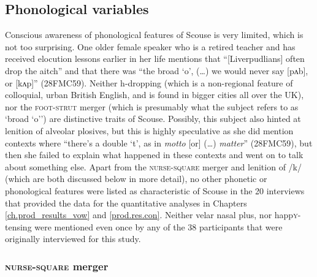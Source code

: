 \subsection{Phonological variables}
\label{aware_res.phon}

Conscious awareness of phonological features of Scouse is very limited, which is not too surprising.
One older female speaker who is a retired teacher and has received elocution lessons earlier in her life mentions that ``[Liverpudlians] often drop the aitch'' and that there was ``the broad `o', (\ldots) we would never say [pʌb], or [kʌp]'' (28FMC59).
Neither h-dropping (which is a non-regional feature of colloquial, urban British English, and is found in bigger cities all over the UK), nor the \textsc{foot}-\textsc{strut} merger (which is presumably what the subject refers to as `broad `o'') are distinctive traits of Scouse.
Possibly, this subject also hinted at lenition of alveolar plosives, but this is highly speculative as she did mention contexts where ``there's a double `t', as in \emph{motto} [or] (\ldots) \emph{matter}'' (28FMC59), but then she failed to explain what happened in these contexts and went on to talk about something else.
Apart from the \textsc{nurse}-\textsc{square} merger and lenition of /k/ (which are both discussed below in more detail), no other phonetic or phonological features were listed as characteristic of Scouse in the 20 interviews that provided the data for the quantitative analyses in Chapters \ref{ch.prod_results_vow} and \ref{prod.res.con}.
Neither velar nasal plus, nor happ\textsc{y}-tensing were mentioned even once by any of the 38 participants that were originally interviewed for this study.

\subsubsection{\textsc{nurse}-\textsc{square} merger}
\label{aware_res.phon.nurse}

